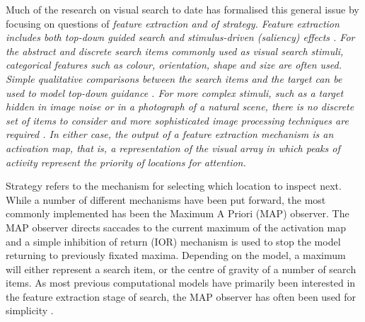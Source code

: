 \documentclass[preprint, authoryear]{elsarticle} %
\begin{document}
Much of the research on visual search to date has formalised this general issue by focusing on questions of  \itshape feature extraction \normalfont  and of \itshape strategy\normalfont. Feature extraction includes both top-down guided search \citep{wolfe2007, zelinsky2008} and stimulus-driven (saliency) effects \citep{itti-koch2000, gao2008, itti-baldi2009}.  For the abstract and discrete search items commonly used as visual search stimuli, categorical features such as colour, orientation, shape and size are often used. Simple qualitative comparisons between the search items and the target can be used to model top-down guidance \citep{pomplun2003, rutishauser-koch2007}. For more complex stimuli, such as a target hidden in image noise or in a photograph of a natural scene, there is no discrete set of items to consider and more sophisticated image processing techniques are required \citep{rao2002, zelinsky2008, pomplun2007,  hwang2009, tavassoli2009}. In either case, the output of a feature extraction mechanism is an activation map, that is, a representation of the visual array in which peaks of activity represent the priority of locations for attention.

\par

Strategy refers to the mechanism for selecting which location to inspect next. While a number of different mechanisms have been put forward, the most commonly implemented has been the Maximum A Priori (MAP) observer. The MAP observer directs saccades to the current maximum of the activation map and a simple inhibition of return (IOR) mechanism is used to stop the model returning to previously fixated maxima. Depending on the model, a maximum will either represent a search item, or the centre of gravity of a number of search items. As most previous computational models have primarily been interested in the feature extraction stage of search, the MAP observer has often been used for simplicity \citep{itti-koch2000, rao2002, pomplun2003, rutishauser-koch2007, clarke2009, zelinsky2008}.
 
 \par
\end{document}
